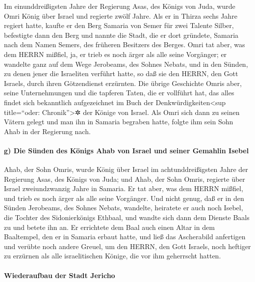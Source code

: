 Im einunddreißigsten Jahre der Regierung Asas, des Königs
von Juda, wurde Omri König über Israel und regierte zwölf Jahre. Als er
in Thirza sechs Jahre regiert hatte, kaufte er den Berg
Samaria von Semer für zwei Talente Silber, befestigte dann den Berg und
nannte die Stadt, die er dort gründete, Samaria nach dem Namen Semers,
des früheren Besitzers des Berges. Omri tat aber, was dem
HERRN mißfiel, ja, er trieb es noch ärger als alle seine Vorgänger;
er wandelte ganz auf dem Wege Jerobeams, des Sohnes
Nebats, und in den Sünden, zu denen jener die Israeliten verführt hatte,
so daß sie den HERRN, den Gott Israels, durch ihren Götzendienst
erzürnten. Die übrige Geschichte Omris aber, seine
Unternehmungen und die tapferen Taten, die er vollführt hat, das alles
findet sich bekanntlich aufgezeichnet im Buch der
Denkwürdigkeiten\textless sup title=``oder: Chronik''\textgreater✲ der
Könige von Israel. Als Omri sich dann zu seinen Vätern
gelegt und man ihn in Samaria begraben hatte, folgte ihm sein Sohn Ahab
in der Regierung nach.

\hypertarget{g-die-suxfcnden-des-kuxf6nigs-ahab-von-israel-und-seiner-gemahlin-isebel}{%
\paragraph{g) Die Sünden des Königs Ahab von Israel und seiner Gemahlin
Isebel}\label{g-die-suxfcnden-des-kuxf6nigs-ahab-von-israel-und-seiner-gemahlin-isebel}}

Ahab, der Sohn Omris, wurde König über Israel im
achtunddreißigsten Jahre der Regierung Asas, des Königs von Juda; und
Ahab, der Sohn Omris, regierte über Israel zweiundzwanzig Jahre in
Samaria. Er tat aber, was dem HERRN mißfiel, und trieb es
noch ärger als alle seine Vorgänger. Und nicht genug, daß
er in den Sünden Jerobeams, des Sohnes Nebats, wandelte, heiratete er
auch noch Isebel, die Tochter des Sidonierkönigs Ethbaal, und wandte
sich dann dem Dienste Baals zu und betete ihn an. Er
errichtete dem Baal auch einen Altar in dem Baaltempel, den er in
Samaria erbaut hatte, und ließ das Ascherabild anfertigen
und verübte noch andere Greuel, um den HERRN, den Gott Israels, noch
heftiger zu erzürnen als alle israelitischen Könige, die vor ihm
geherrscht hatten.

\hypertarget{wiederaufbau-der-stadt-jericho}{%
\paragraph{Wiederaufbau der Stadt
Jericho}\label{wiederaufbau-der-stadt-jericho}}

